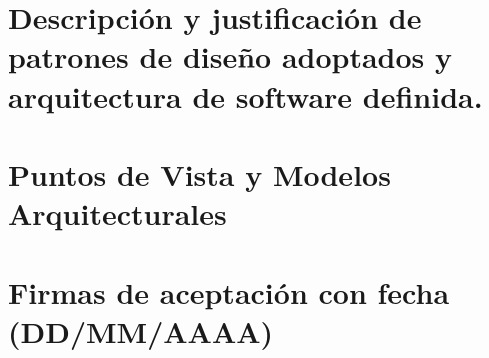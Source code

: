\documentclass[a4paper, 12pt]{article}
\begin{document}
\section{Descripción y justificación de patrones de diseño adoptados y arquitectura de software definida.}


\newpage
\section{Puntos de Vista y Modelos Arquitecturales}


\section{Firmas de aceptación con fecha (DD/MM/AAAA)}

\newpage


\end{document}
